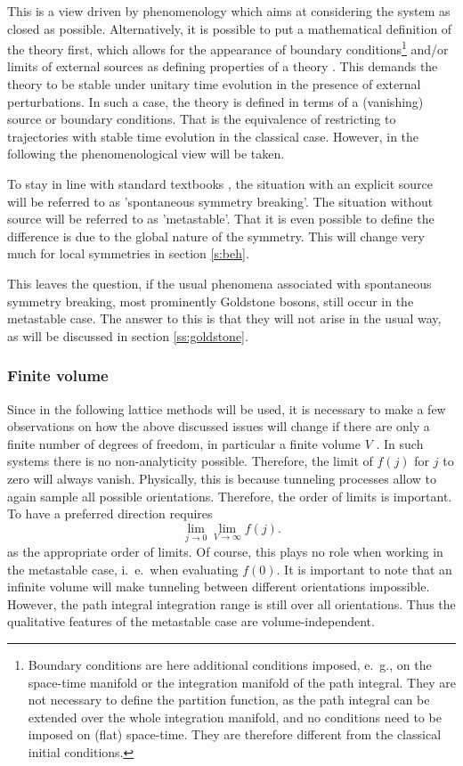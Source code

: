 \documentclass[final,twoside,12pt]{article}
\newcommand*{\no}{\noindent}
\newcommand*{\be}{\begin{equation}}
\newcommand*{\ee}{\end{equation}}
\newcommand*{\nn}{\nonumber}
\newcommand*{\1}{1\!\!\!\bot}
\begin{document}
This is a view driven by phenomenology which aims at considering the system as closed as possible. Alternatively, it is possible to put a mathematical definition of the theory first, which allows for the appearance of boundary conditions\footnote{Boundary conditions are here additional conditions imposed, e.\ g., on the space-time manifold or the integration manifold of the path integral. They are not necessary to define the partition function, as the path integral can be extended over the whole integration manifold, and no conditions need to be imposed on (flat) space-time. They are therefore different from the classical initial conditions.} and/or limits of external sources as defining properties of a theory \cite{Strocchi:2005yk,Frohlich:1976it}. This demands the theory to be stable under unitary time evolution in the presence of external perturbations. In such a case, the theory is defined in terms of a (vanishing) source or boundary conditions. That is the equivalence of restricting to trajectories with stable time evolution in the classical case. However, in the following the phenomenological view will be taken.

To stay in line with standard textbooks \cite{Bohm:2001yx,Weinberg:1996kr}, the situation with an explicit source will be referred to as 'spontaneous symmetry breaking'. The situation without source will be referred to as 'metastable'. That it is even possible to define the difference is due to the global nature of the symmetry. This will change very much for local symmetries in section \ref{s:beh}.

This leaves the question, if the usual phenomena associated with spontaneous symmetry breaking, most prominently Goldstone bosons, still occur in the metastable case. The answer to this is that they will not arise in the usual way, as will be discussed in section \ref{ss:goldstone}. 

\subsubsection{Finite volume}

Since in the following lattice methods will be used, it is necessary to make a few observations on how the above discussed issues will change if there are only a finite number of degrees of freedom, in particular a finite volume $V$ \cite{Landau:2005mc,Perez:2008fv,Birman:2013gaa}. In such systems there is no non-analyticity possible. Therefore, the limit of $f(j)$ for $j$ to zero will always vanish. Physically, this is because tunneling processes allow to again sample all possible orientations. Therefore, the order of limits is important. To have a preferred direction requires
\be
\lim_{j\to 0}\lim_{V\to\infty}f(j)\nn.
\ee
\no as the appropriate order of limits. Of course, this plays no role when working in the metastable case, i.\ e.\ when evaluating $f(0)$. It is important to note that an infinite volume will make tunneling between different orientations impossible. However, the path integral integration range is still over all orientations. Thus the qualitative features of the metastable case are volume-independent.
\end{document}
